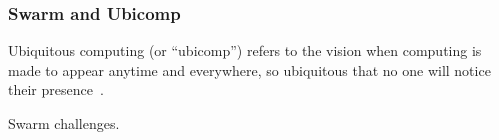 \subsubsection{Swarm and Ubicomp}
\label{sec:swarm-wsn}

Ubiquitous computing (or ``ubicomp'') refers to the vision when computing is
made to appear anytime and everywhere, so ubiquitous that no one will notice
their presence~\cite{weiser1993ubiquitous}.

Swarm challenges.

